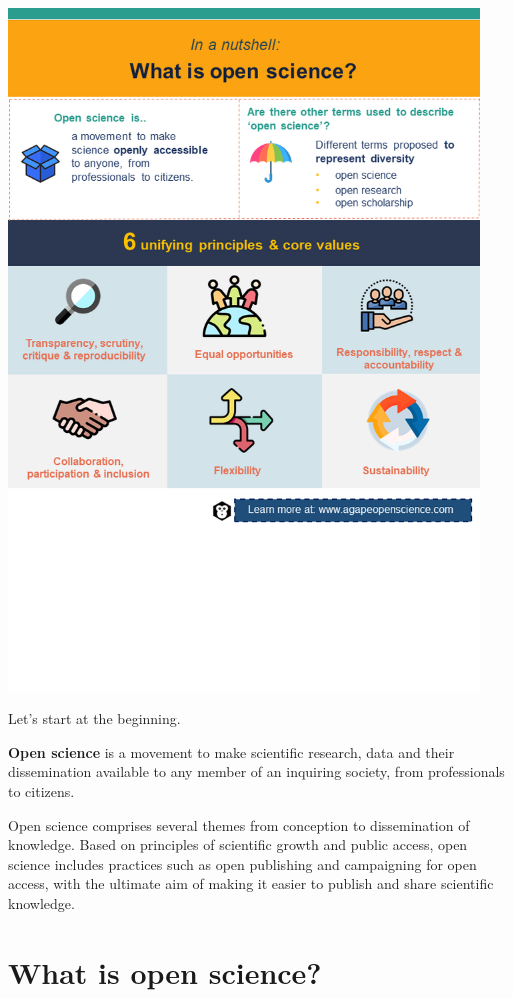 \documentclass[
]{book}
\begin{document}
\includegraphics[width=4.91667in,height=\textheight]{images/slide1.png}

Let's start at the beginning.

\textbf{Open science} is a movement to make scientific research, data and their dissemination available to any member of an inquiring society, from professionals to citizens.

Open science comprises several themes from conception to dissemination of knowledge. Based on principles of scientific growth and public access, open science includes practices such as open publishing and campaigning for open access, with the ultimate aim of making it easier to publish and share scientific knowledge.

\hypertarget{what-is-open-science}{%
\section{What is open science?}\label{what-is-open-science}}
\end{document}
